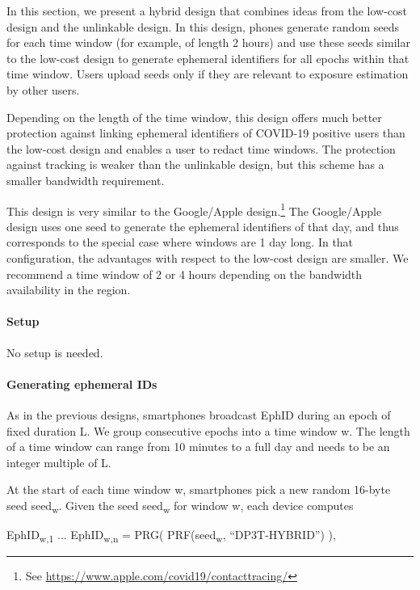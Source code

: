 \documentclass{article}
\begin{document}
In this section, we present a hybrid design that combines ideas from the
low-cost design and the unlinkable design. In this design, phones
generate random seeds for each time window (for example, of length 2
hours) and use these seeds similar to the low-cost design to generate
ephemeral identifiers for all epochs within that time window. Users
upload seeds only if they are relevant to exposure estimation by other
users.

Depending on the length of the time window, this design offers much
better protection against linking ephemeral identifiers of COVID-19
positive users than the low-cost design and enables a user to redact
time windows. The protection against tracking is weaker than the
unlinkable design, but this scheme has a smaller bandwidth requirement.

This design is very similar to the Google/Apple design.\footnote{See
  \href{https://www.apple.com/covid19/contacttracing/}{{https://www.apple.com/covid19/contacttracing/}}}
The Google/Apple design uses one seed to generate the ephemeral
identifiers of that day, and thus corresponds to the special case where
windows are 1 day long. In that configuration, the advantages with
respect to the low-cost design are smaller. We recommend a time window
of 2 or 4 hours depending on the bandwidth availability in the region.

\hypertarget{setup-2}{%
\paragraph{Setup}\label{setup-2}}

No setup is needed.

\hypertarget{generating-ephemeral-ids-1}{%
\paragraph{Generating ephemeral IDs}\label{generating-ephemeral-ids-1}}

As in the previous designs, smartphones broadcast EphID during an epoch
of fixed duration L. We group consecutive epochs into a time window w.
The length of a time window can range from 10 minutes to a full day and
needs to be an integer multiple of L.

At the start of each time window w, smartphones pick a new random
16-byte seed seed\textsubscript{w}. Given the seed seed\textsubscript{w}
for window w, each device computes

EphID\textsubscript{w,1} \textbar\textbar{} ... \textbar\textbar{}
EphID\textsubscript{w,n} = PRG( PRF(seed\textsubscript{w},
``DP3T-HYBRID'') ),
\end{document}
